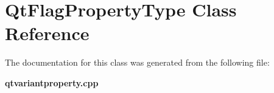 \section{Qt\+Flag\+Property\+Type Class Reference}
\label{classQtFlagPropertyType}


The documentation for this class was generated from the following file\+:\begin{DoxyCompactItemize}
\item 
{\bf qtvariantproperty.\+cpp}\end{DoxyCompactItemize}
